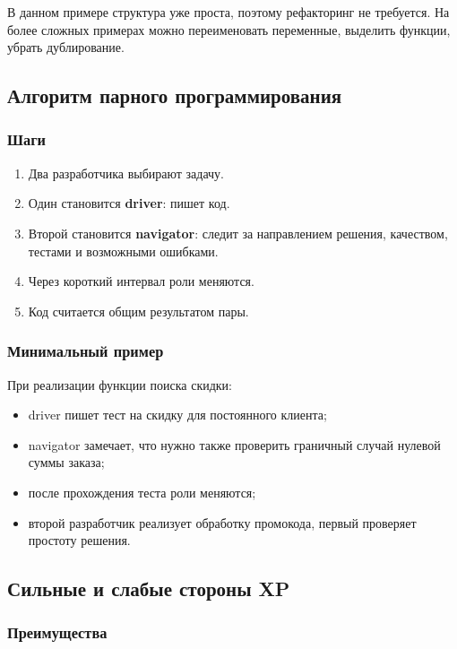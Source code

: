 \documentclass[12pt,a4paper]{article}
\begin{document}
В данном примере структура уже проста, поэтому рефакторинг не требуется. На более сложных примерах можно переименовать переменные, выделить функции, убрать дублирование.

\subsection{Алгоритм парного программирования}

\subsubsection*{Шаги}

\begin{enumerate}
    \item Два разработчика выбирают задачу.
    \item Один становится \textbf{driver}: пишет код.
    \item Второй становится \textbf{navigator}: следит за направлением решения, качеством, тестами и возможными ошибками.
    \item Через короткий интервал роли меняются.
    \item Код считается общим результатом пары.
\end{enumerate}

\subsubsection*{Минимальный пример}

При реализации функции поиска скидки:
\begin{itemize}
    \item driver пишет тест на скидку для постоянного клиента;
    \item navigator замечает, что нужно также проверить граничный случай нулевой суммы заказа;
    \item после прохождения теста роли меняются;
    \item второй разработчик реализует обработку промокода, первый проверяет простоту решения.
\end{itemize}

\subsection{Сильные и слабые стороны XP}

\subsubsection*{Преимущества}
\end{document}
